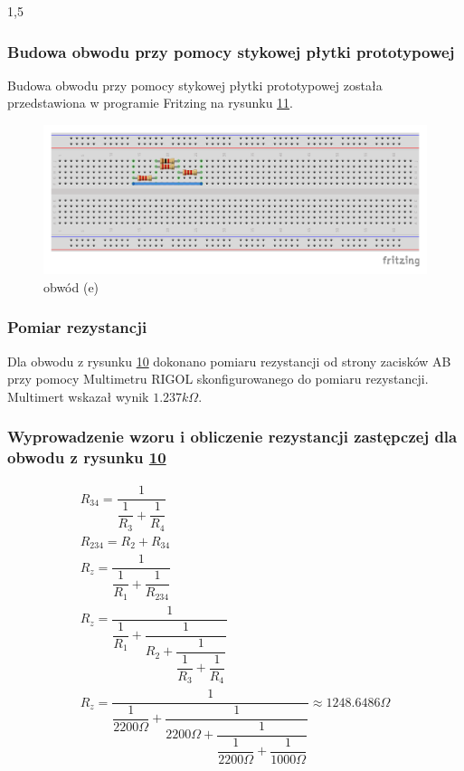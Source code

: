 \documentclass[polish,polish,a4paper]{article}
\begin{document}
\begin{spacing}{1,5}
		\subsubsection*{Budowa obwodu przy pomocy stykowej płytki prototypowej}
		Budowa obwodu przy pomocy stykowej płytki prototypowej została przedstawiona w programie Fritzing na rysunku \hyperref[fig:rys11]{11}.
		\begin{figure}[H]
			\centering
			\includegraphics[scale=0.9]{e_bb.pdf}
			\caption{obwód (e)}
			\label{fig:rys11}
		\end{figure}
		\subsubsection*{Pomiar rezystancji}
		Dla obwodu z rysunku \hyperref[eq:rys10]{10} dokonano pomiaru rezystancji od strony zacisków AB przy pomocy Multimetru RIGOL skonfigurowanego do pomiaru rezystancji. Multimert wskazał wynik $1.237k\Omega$.
		
		\subsubsection*{Wyprowadzenie wzoru i obliczenie rezystancji zastępczej  dla obwodu z rysunku \hyperref[eq:rys10]{10}}	
		\begin{gather*}
		R_{34} = \dfrac{1}{\dfrac{1}{R_{3}} + \dfrac{1}{R_{4}}}\\
		R_{234} = R_{2} + R_{34}\\
		R_{z} = \dfrac{1}{\dfrac{1}{R_{1}} + \dfrac{1}{R_{234}}}\\
		R_{z} = \dfrac{1}{\dfrac{1}{R_{1}} + \dfrac{1}{R_{2} + \dfrac{1}{\dfrac{1}{R_{3}} + \dfrac{1}{R_{4}}}}}\\
		R_{z} = \dfrac{1}{\dfrac{1}{2200\Omega} + \dfrac{1}{2200\Omega + \dfrac{1}{\dfrac{1}{2200\Omega} + \dfrac{1}{1000\Omega}}}} \approx 1248.6486\Omega\\
		\end{gather*}
		

\end{spacing}
\end{document}
